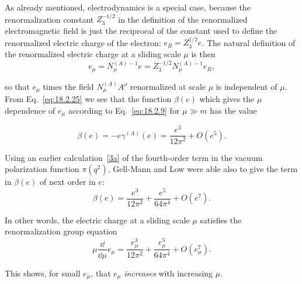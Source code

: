 As already mentioned, electrodynamics is a special case, because the
renormalization constant $Z_3^{-1/2}$ in the definition of the renormalized
electromagnetic field is just the reciprocal of the constant used to define
the renormalized electric charge of the electron: $e_R=Z_3^{1/2}e$. The
natural definition of the renormalized electric charge at a sliding scale
$\mu$ is then
\begin{equation}
e_\mu=N_\mu^{(A)-1}e=Z_3^{-1/2}N_\mu^{(A)-1}e_R,
\tag{18.2.36}\label{eq:18.2.36}
\end{equation}
\par\noindent
\begin{sloppypar}
so that $e_\mu$ times the field $N_\mu^{(A)}A^\rho$ renormalized at scale
$\mu$ is independent of $\mu$. From Eq.~\eqref{eq:18.2.25} we see that the
function $\beta(e)$ which gives the $\mu$ dependence of $e_\mu$ according to
Eq.~\eqref{eq:18.2.9} for $\mu\gg m$ has the value
\end{sloppypar}
\begin{equation}
\beta(e)=-e\gamma^{(A)}(e)=\frac{e^3}{12\pi^2}+O(e^5).
\tag{18.2.37}\label{eq:18.2.37}
\end{equation}
\par\noindent
Using an earlier calculation~\hyperref[ch18-ref-3a]{[3a]} of the fourth-order
term in the vacuum polarization function $\pi(q^2)$, Gell-Mann and Low were
able also to give the term in $\beta(e)$ of next order in $e$:
\begin{equation}
\beta(e)=\frac{e^3}{12\pi^2}+\frac{e^5}{64\pi^4}+O(e^7).
\tag{18.2.38}\label{eq:18.2.38}
\end{equation}
\par\noindent
In other words, the electric charge at a sliding scale $\mu$ satisfies the
renormalization group equation
\begin{equation}
\mu\frac{\dd}{\dd\mu}e_\mu
=\frac{e_\mu^3}{12\pi^2}+\frac{e_\mu^5}{64\pi^4}+O(e_\mu^7).
\tag{18.2.39}\label{eq:18.2.39}
\end{equation}
\par\noindent
This shows, for small $e_\mu$, that $e_\mu$ \emph{increases} with increasing
$\mu$.

